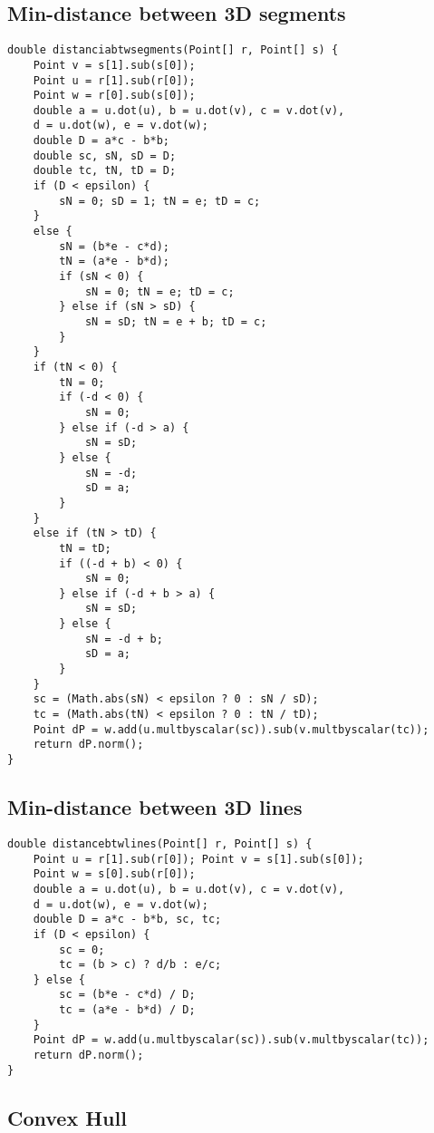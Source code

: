\documentclass[10pt,letterpaper,twocolumn,twosided]{article}
\begin{document}
\subsection{Min-distance between 3D segments}

\begin{lstlisting}
double distanciabtwsegments(Point[] r, Point[] s) {
    Point v = s[1].sub(s[0]);
    Point u = r[1].sub(r[0]);
    Point w = r[0].sub(s[0]);
    double a = u.dot(u), b = u.dot(v), c = v.dot(v), 
    d = u.dot(w), e = v.dot(w);
    double D = a*c - b*b;
    double sc, sN, sD = D;
    double tc, tN, tD = D;
    if (D < epsilon) {
        sN = 0; sD = 1; tN = e; tD = c;
    } 
    else {
        sN = (b*e - c*d);
        tN = (a*e - b*d);
        if (sN < 0) {
            sN = 0; tN = e; tD = c;
        } else if (sN > sD) {
            sN = sD; tN = e + b; tD = c;
        }
    }
    if (tN < 0) {
        tN = 0;
        if (-d < 0) {
            sN = 0;
        } else if (-d > a) {
            sN = sD;
        } else {
            sN = -d;
            sD = a;
        }
    } 
    else if (tN > tD) {
        tN = tD;
        if ((-d + b) < 0) {
            sN = 0;
        } else if (-d + b > a) {
            sN = sD;
        } else {
            sN = -d + b;
            sD = a;
        }
    }
    sc = (Math.abs(sN) < epsilon ? 0 : sN / sD);
    tc = (Math.abs(tN) < epsilon ? 0 : tN / tD);
    Point dP = w.add(u.multbyscalar(sc)).sub(v.multbyscalar(tc));
    return dP.norm();
}
\end{lstlisting}

\subsection{Min-distance between 3D lines}


\begin{lstlisting}
double distancebtwlines(Point[] r, Point[] s) {
    Point u = r[1].sub(r[0]); Point v = s[1].sub(s[0]); 
    Point w = s[0].sub(r[0]);
    double a = u.dot(u), b = u.dot(v), c = v.dot(v), 
    d = u.dot(w), e = v.dot(w);
    double D = a*c - b*b, sc, tc;
    if (D < epsilon) {
        sc = 0;
        tc = (b > c) ? d/b : e/c;
    } else {
        sc = (b*e - c*d) / D;
        tc = (a*e - b*d) / D;
    }
    Point dP = w.add(u.multbyscalar(sc)).sub(v.multbyscalar(tc));
    return dP.norm();
}
\end{lstlisting}

\subsection{Convex Hull}
\end{document}
